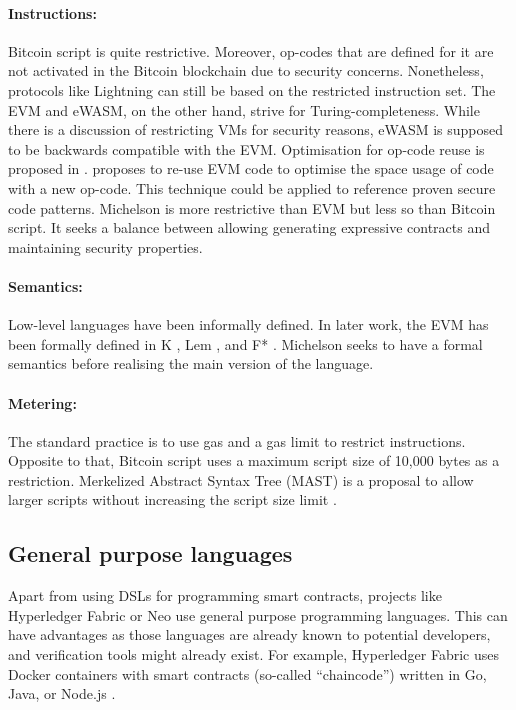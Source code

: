 \documentclass{llncs}
\begin{document}
\paragraph{Instructions:} Bitcoin script is quite restrictive. Moreover, op-codes that are defined for it are not activated in the Bitcoin blockchain due to security concerns. Nonetheless, protocols like Lightning \cite{Poon2016} can still be based on the restricted instruction set.
The EVM and eWASM, on the other hand, strive for Turing-completeness. While there is a discussion of restricting VMs for security reasons, eWASM is supposed to be backwards compatible with the EVM.
Optimisation for op-code reuse is proposed in \cite{Pontiveros2018}.
\citeauthor{Pontiveros2018} proposes to re-use EVM code to optimise the space usage of code with a new op-code. This technique could be applied to reference proven secure code patterns.
Michelson is more restrictive than EVM but less so than Bitcoin script. It seeks a balance between allowing generating expressive contracts and maintaining security properties.

\paragraph{Semantics:} Low-level languages have been informally defined. In later work, the EVM has been formally defined in K \cite{Hildenbrandt2017}, Lem \cite{Hirai2017}, and F* \cite{Grishchenko2018}. Michelson seeks to have a formal semantics before realising the main version of the language.

\paragraph{Metering:} The standard practice is to use gas and a gas limit to restrict instructions. Opposite to that, Bitcoin script uses a maximum script size of 10,000 bytes as a restriction. Merkelized Abstract Syntax Tree (MAST) is a proposal to allow larger scripts without increasing the script size limit \cite{Harding2017}.


\subsection{General purpose languages}
Apart from using DSLs for programming smart contracts, projects like Hyperledger Fabric or Neo use general purpose programming languages.
This can have advantages as those languages are already known to potential developers, and verification tools might already exist.
For example, Hyperledger Fabric uses Docker containers with smart contracts (so-called ``chaincode'') written in Go, Java, or Node.js \cite{Cachin2016}. 
\end{document}
